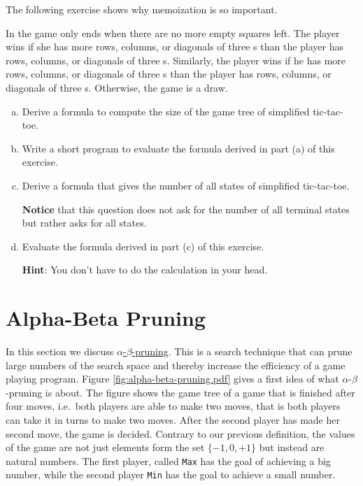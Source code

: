 \noindent
The following exercise shows why memoization is so important.

\exercise
In  the game only ends when there are no more empty squares left.
The player  wins if she has more rows, columns, or diagonals of three s than the player
 has rows, columns, or diagonals of three s.  Similarly, the player  wins
if he has more rows, columns, or diagonals of three s than the player  has rows, columns,
or diagonals of three s.  Otherwise, the game is a draw. 
\begin{enumerate}[(a)]
\item Derive a formula to compute the size of the game tree of simplified tic-tac-toe.
\item Write a short program to evaluate the formula derived in part (a) of this exercise.
\item Derive a formula that gives the number of all states of simplified tic-tac-toe.  

      \textbf{Notice} that this question does not ask for the number of all terminal states but rather asks for
      all states. 
\item Evaluate the formula derived in part (c) of this exercise.
      
      \textbf{Hint}: You don't have to do the calculation in your head.
      \eox
\end{enumerate}

\section{Alpha-Beta Pruning}
In this section we discuss \href{https://en.wikipedia.org/wiki/Alpha-beta_pruning}{$\alpha$-$\beta$-pruning}.
This is a search technique that can prune large numbers of the search space and thereby increase the efficiency
of a game playing program.  Figure \ref{fig:alpha-beta-pruning.pdf} gives a first idea of what
$\alpha$-$\beta$-pruning is about.  The figure shows the game tree of a game that is finished after four moves,
i.e.~both players are able to make two moves, that is both players can take it in turns to make two moves.
After the second player has made her second move, the game is decided.  Contrary to our previous definition,
the values of the game are not just elements form the set $\{-1, 0, +1\}$ but instead are natural numbers.
The first player, called \texttt{Max} has the goal of achieving a big number, while the second player
\texttt{Min} has the goal to achieve a small number.


